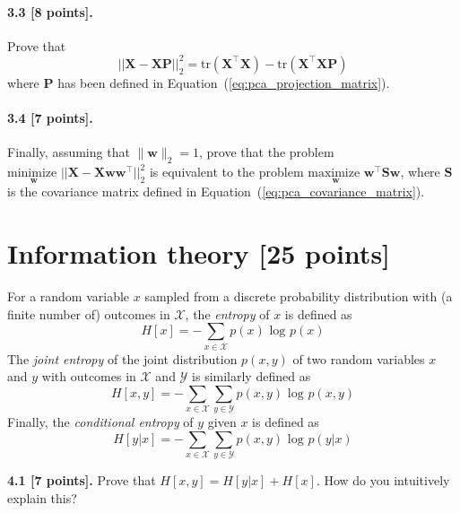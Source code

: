 \documentclass{article}
\begin{document}
\paragraph{3.3 [8 points].} Prove that
\begin{equation}
\label{eq:pca_reconstruction_error_proof}
||\mathbf{X} - \mathbf{XP} ||_2^2 = \text{tr}(\mathbf{X}^\top\mathbf{X}) - \text{tr}(\mathbf{X}^\top\mathbf{X}\mathbf{P})
\end{equation}
where $\mathbf{P}$ has been defined in Equation~(\ref{eq:pca_projection_matrix}).

\paragraph{3.4 [7 points].} Finally, assuming that $\lVert \mathbf{w} \rVert_2 = 1$, prove that the problem 
$\underset{\mathbf{w}}{\text{minimize }} ||\mathbf{X} - \mathbf{X} \mathbf{w} \mathbf{w}^\top||_2^2$
is equivalent to the problem
$\underset{\mathbf{w}}{\text{maximize }} \mathbf{w}^\top \mathbf{S} \mathbf{w}$,
where $\mathbf{S}$ is the covariance matrix defined in Equation~(\ref{eq:pca_covariance_matrix}).





\section{Information theory [25 points]}

For a random variable $x$ sampled from a discrete probability distribution with (a finite number of) outcomes in $\mathcal{X}$, the \textit{entropy} of $x$ is defined as
\begin{equation}
H[x] = - \sum_{x \in \mathcal{X}} p(x) \text{ log } p(x)
\end{equation}
The \textit{joint entropy} of the joint distribution $p(x,y)$ of two random variables $x$ and $y$ with outcomes in $\mathcal{X}$ and $\mathcal{Y}$ is similarly defined as
\begin{equation}
H[x,y] = - \sum_{x \in \mathcal{X}} \sum_{y \in \mathcal{Y}} p(x,y) \text{ log } p(x,y)
\end{equation}
Finally, the \textit{conditional entropy} of $y$ given $x$ is defined as
\begin{equation}
H[y|x] = - \sum_{x \in \mathcal{X}} \sum_{y \in \mathcal{Y}} p(x,y) \text{ log } p(y|x)
\end{equation}

\noindent\textbf{4.1 [7 points].} Prove that $H[x,y] = H[y|x] + H[x]$. How do you intuitively explain this?
\end{document}

